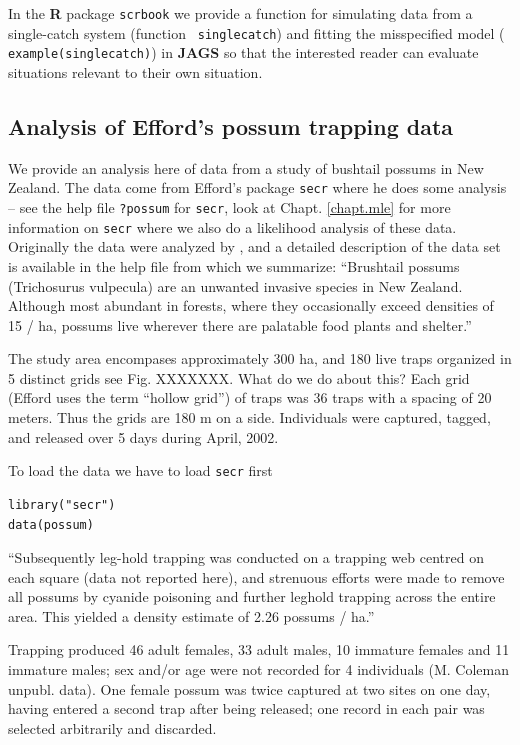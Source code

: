 In the {\bf R} package \mbox{\tt scrbook} we provide a function for
simulating data from a single-catch system (function \mbox{\tt
  singlecatch}) and fitting the misspecified model (\mbox{\tt
  example(singlecatch)}) in {\bf JAGS} so that the interested reader
can evaluate situations relevant to their own situation.

\subsection{Analysis of Efford's possum trapping data}


We provide an analysis here of data from a study of bushtail possums
in New Zealand. The data come from Efford's package \mbox{\tt secr}
where he does some analysis -- see the help file \mbox{\tt ?possum}
for \mbox{\tt secr},
look at Chapt. \ref{chapt.mle} for more information on \mbox{\tt secr}
where we also do a likelihood analysis of these data.
Originally the data were analyzed by \citet{efford_etal:2005}, and 
a detailed description of the data set is available in the help file
from which we summarize:
``Brushtail possums (Trichosurus vulpecula) are an unwanted invasive
species in New Zealand. Although most abundant in forests, where they
occasionally exceed densities of 15 / ha, possums live wherever there
are palatable food plants and shelter.''

The study area encompases approximately 300 ha, and 180 live traps
organized in 5 distinct grids see Fig. XXXXXXX. 
What do we do about this?
Each grid (Efford uses
the term ``hollow grid'') of traps was
36 traps with a spacing of 20 meters. Thus the grids are 180 m on a
side. 
Individuals were captured, tagged, and released over 5 days during
April, 2002.


To load the data we have to load \mbox{\tt secr} first
\begin{verbatim}
library("secr")
data(possum)
\end{verbatim}


``Subsequently
leg-hold trapping was conducted on a trapping web centred on each
square (data not reported here), and strenuous efforts were made to
remove all possums by cyanide poisoning and further leghold trapping
across the entire area. This yielded a density estimate of 2.26
possums / ha.''


Trapping produced 
46 adult females, 33 adult males, 10 immature females and 11
immature males; sex and/or age were not recorded for 4 individuals
(M. Coleman unpubl. data). One female possum was twice captured at two
sites on one day, having entered a second trap after being released;
one record in each pair was selected arbitrarily and discarded.

